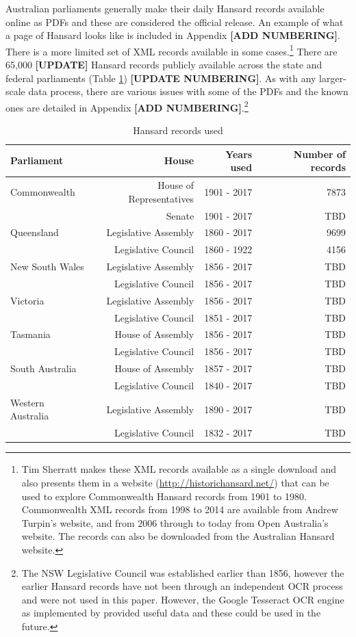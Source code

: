 \documentclass[12pt,]{article}
\theoremstyle{definition}
\theoremstyle{definition}
\theoremstyle{definition}
\theoremstyle{remark}
\begin{document}
Australian parliaments generally make their daily Hansard records
available online as PDFs and these are considered the official release.
An example of what a page of Hansard looks like is included in Appendix
\textbf{{[}ADD NUMBERING{]}}. There is a more limited set of XML records
available in some cases.\footnote{Tim Sherratt makes these XML records
  available as a single download and also presents them in a website
  (\url{http://historichansard.net/}) that can be used to explore
  Commonwealth Hansard records from 1901 to 1980. Commonwealth XML
  records from 1998 to 2014 are available from Andrew Turpin's website,
  and from 2006 through to today from Open Australia's website. The
  records can also be downloaded from the Australian Hansard website.}
There are 65,000 \textbf{{[}UPDATE{]}} Hansard records publicly
available across the state and federal parliaments (Table
\ref{tab:yearsusedtable}) \textbf{{[}UPDATE NUMBERING{]}}. As with any
larger-scale data process, there are various issues with some of the
PDFs and the known ones are detailed in Appendix \textbf{{[}ADD
NUMBERING{]}}.\footnote{The NSW Legislative Council was established
  earlier than 1856, however the earlier Hansard records have not been
  through an independent OCR process and were not used in this paper.
  However, the Google Tesseract OCR engine as implemented by
  \citet{Ooms2018tesseract} provided useful data and these could be used
  in the future.}

\begin{table}

\caption{\label{tab:yearsusedtable}Hansard records used}
\centering
\fontsize{12}{14}\selectfont
\begin{tabular}[t]{lrrr}
\toprule
Parliament & House & Years used & Number of records\\
\midrule
Commonwealth & House of Representatives & 1901 - 2017 & 7873\\
 & Senate & 1901 - 2017 & TBD\\
Queensland & Legislative Assembly & 1860 - 2017 & 9699\\
 & Legislative Council & 1860 - 1922 & 4156\\
New South Wales & Legislative Assembly & 1856 - 2017 & TBD\\
\addlinespace
 & Legislative Council & 1856 - 2017 & TBD\\
Victoria & Legislative Assembly & 1856 - 2017 & TBD\\
 & Legislative Council & 1851 - 2017 & TBD\\
Tasmania & House of Assembly & 1856 - 2017 & TBD\\
 & Legislative Council & 1856 - 2017 & TBD\\
\addlinespace
South Australia & House of Assembly & 1857 - 2017 & TBD\\
 & Legislative Council & 1840 - 2017 & TBD\\
Western Australia & Legislative Assembly & 1890 - 2017 & TBD\\
 & Legislative Council & 1832 - 2017 & TBD\\
\bottomrule
\end{tabular}
\end{table}
\end{document}

